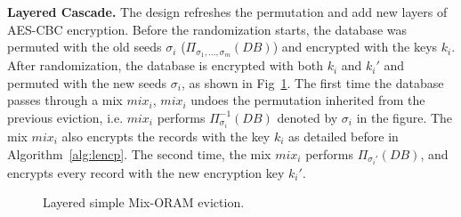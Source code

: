 \documentclass[USenglish,oneside,twocolumn]{article}
\begin{document}
\noindent\textbf{Layered Cascade.} The design refreshes the permutation and add new layers of AES-CBC encryption. Before the randomization starts, the database was permuted with the old seeds $\sigma_i$ ($\Pi_{\sigma_1,...,\sigma_m}\left ( DB \right )$) and encrypted with the keys $k_i$. After randomization, the database is encrypted with both $k_i$ and $k_i'$ and permuted with the new seeds $\sigma_i$, as shown in Fig~\ref{fig:ASMO_L}.
The first time the database passes through a mix $mix_i$, $mix_i$ undoes the permutation  inherited from the previous eviction, i.e. $mix_i$ performs $\Pi_{\sigma_i}^{-1}\left(DB\right)$ denoted by $\sigma_i$ in the figure. The mix $mix_i$ also encrypts the records with the key $k_i$ as detailed before in Algorithm~\ref{alg:lencp}. The second time, the mix $mix_i$ performs $\Pi_{\sigma_i'}\left(DB\right)$, and encrypts every record with the new encryption key $k_{i}'$.\\
%
\begin{figure}[H]
\begin{minipage}{0.475\textwidth}
\begin{adjustbox}{width=\textwidth}
\centering
{}
\end{adjustbox}
\centering
\caption{Layered simple Mix-ORAM eviction.} \label{fig:ASMO_L}
\end{minipage}
\end{figure} 
\end{document}
